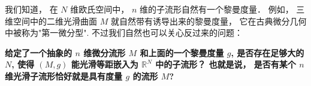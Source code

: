 
\begin{issues}
\issueDraft
\end{issues}


我们知道， 在 $N$ 维欧氏空间中， $n$ 维的子流形自然有一个黎曼度量． 例如， 三维空间中的二维光滑曲面 $M$ 就自然带有诱导出来的黎曼度量， 它在古典微分几何中被称为"第一微分型". 不过我们自然也可以关心反过来的问题： 

\textbf{给定了一个抽象的 $n$ 维微分流形 $M$ 和上面的一个黎曼度量 $g$, 是否存在足够大的 $N$, 使得 $(M,g)$ 能光滑等距嵌入为 $\mathbb{R}^N$ 中的子流形？ 也就是说， 是否有某个 $n$ 维光滑子流形恰好就是具有度量 $g$ 的流形 $M$?}
